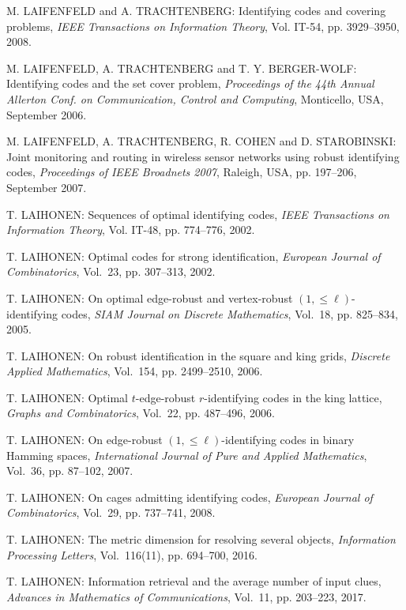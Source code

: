\begin{thebibliography}{999}
M. LAIFENFELD and A. TRACHTENBERG: Identifying codes and covering problems, {\it IEEE Transactions on Information Theory}, Vol. IT-54, pp. 3929--3950, 2008.

M. LAIFENFELD, A. TRACHTENBERG and T. Y. BERGER-WOLF: Identifying codes and the set cover problem, {\it Proceedings of the 44th Annual Allerton Conf. on Communication, Control and Computing}, Monticello, USA, September 2006.

M. LAIFENFELD, A. TRACHTENBERG, R. COHEN and D. STARO\-BINSKI: Joint monitoring and routing in wireless sensor networks using robust identifying codes, {\it Proceedings of IEEE Broadnets 2007}, Raleigh, USA, pp. 197--206, September 2007.

T. LAIHONEN: Sequences of optimal identifying codes, {\it IEEE Transactions on Information Theory}, Vol. IT-48, pp. 774--776, 2002.

T. LAIHONEN: Optimal codes for strong identification, {\it European Journal of Combinatorics}, Vol.~23, pp. 307--313, 2002.

T. LAIHONEN: On optimal edge-robust and vertex-robust $(1,\leq\ell)$-identifying codes, {\it SIAM Journal on Discrete Mathematics}, Vol.~18, pp. 825--834, 2005.

T. LAIHONEN: On robust identification in the square and king grids, {\it Discrete Applied Mathematics}, Vol.~154, pp. 2499--2510, 2006.


T. LAIHONEN: Optimal $t$-edge-robust $r$-identifying codes in the king lattice, {\it Graphs and Combinatorics}, Vol.~22, pp. 487--496, 2006.

T. LAIHONEN: On edge-robust $(1,\leq\ell)$-identifying codes in binary Hamming spaces, {\it International Journal of Pure and Applied Mathematics}, Vol.~36, pp. 87--102, 2007.

T. LAIHONEN: On cages admitting identifying codes, {\it European Journal of Combinatorics}, Vol.~29, pp. 737--741, 2008. 

T. LAIHONEN: The metric dimension for resolving several objects, {\it Information Processing Letters}, Vol.~116(11), pp. 694--700, 2016.

T. LAIHONEN: Information retrieval and the average number of input clues, {\it Advances in Mathematics of Communications}, Vol.~11, pp. 203--223, 2017.
 

\end{thebibliography}

